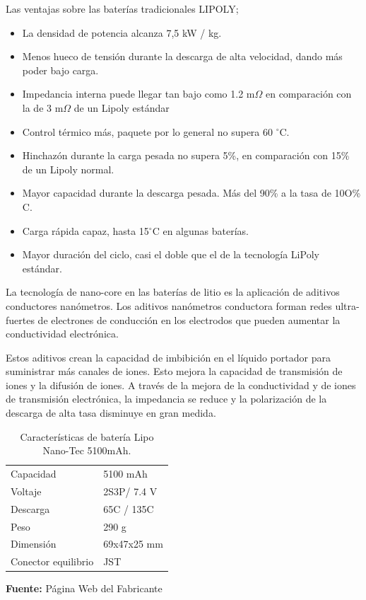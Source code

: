 Las ventajas sobre las bater\'ias tradicionales LIPOLY;
\begin{itemize}
    \item La densidad de potencia alcanza 7,5 kW / kg.
    \item Menos hueco de tensi\'on durante la descarga de alta velocidad, dando m\'as poder bajo carga.
    \item Impedancia interna puede llegar tan bajo como 1.2 m${\Omega }$ en comparación con la de 3 m${\Omega }$ de un Lipoly estándar
    \item Control t\'ermico m\'as, paquete por lo general no supera 60 $^{\circ}$C.
    \item Hinchazón durante la carga pesada no supera 5\%, en comparación con 15\% de un Lipoly normal.
    \item Mayor capacidad durante la descarga pesada. M\'as del 90\% a la tasa de 10O\% C.
    \item Carga r\'apida capaz, hasta 15$^{\circ}$C en algunas baterías.
    \item Mayor duraci\'on del ciclo, casi el doble que el de la tecnolog\'ia LiPoly est\'andar.
\end{itemize}


La tecnolog\'ia de nano-core en las bater\'ias de litio es la aplicaci\'on de aditivos conductores nan\'ometros. Los aditivos nan\'ometros conductora forman redes ultra-fuertes de electrones de conducci\'on en los electrodos que pueden aumentar la conductividad electr\'onica.

Estos aditivos crean la capacidad de imbibici\'on en el l\'iquido portador para suministrar m\'as canales de iones. Esto mejora la capacidad de transmisi\'on de iones y la difusi\'on de iones. A trav\'es de la mejora de la conductividad y de iones de transmisi\'on electr\'onica, la impedancia se reduce y la polarizaci\'on de la descarga de alta tasa disminuye en gran medida.

\hfill
\begin{table}[t]
\protect\caption[Caracter\'isticas de bater\'ia Lipo Nano-Tech ]{Caracter\'isticas de bater\'ia Lipo Nano-Tec 5100mAh.}
\label{tab:caract_bat}
\begin{center}
\begin{tabular}{l l}
\hline
Capacidad    &  5100 mAh \\
Voltaje      &  2S3P/ 7.4 V \\
Descarga &  65C / 135C \\
Peso  & 290 g\\
Dimensi\'on   &  69x47x25 mm\\
Conector equilibrio	& JST\\
\hline
\end{tabular}
\vspace{5mm}
\newline
\hfill \textbf{Fuente:} P\'agina Web del Fabricante\cite{bateria}
\end{center}
\end{table}

